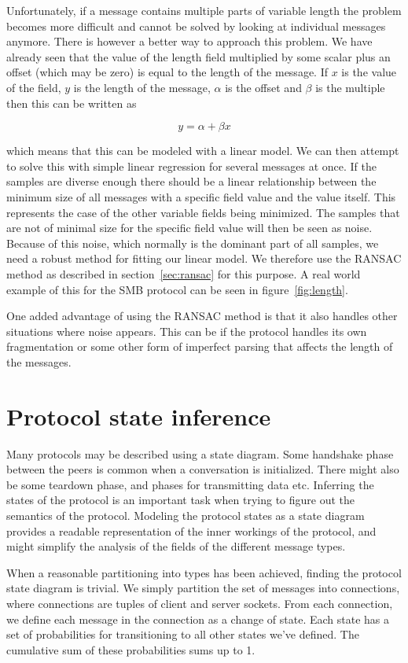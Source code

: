 \documentclass[a4paper]{report}
\begin{document}
Unfortunately, if a message contains multiple parts of variable length the
problem becomes more difficult and cannot be solved by looking at individual
messages anymore. There is however a better way to approach this problem. We
have already seen that the value of the length field multiplied by some scalar
plus an offset (which may be zero) is equal to the length of the message. If
$x$ is the value of the field, $y$ is the length of the message, $\alpha$ is the
offset and $\beta$ is the multiple then this can be written as

\[
    y = \alpha + \beta x
    \label{eq:linlength}
\]

which means that this can be modeled with a linear model. We can then attempt
to solve this with simple linear regression for several messages at once. If
the samples are diverse enough there should be a linear relationship between
the minimum size of all messages with a specific field value and the value
itself. This represents the case of the other variable fields being minimized.
The samples that are not of minimal size for the specific field value will then
be seen as noise. Because of this noise, which normally is the dominant part of
all samples, we need a robust method for fitting our linear model. We therefore
use the RANSAC method as described in section~\ref{sec:ransac} for this
purpose. A real world example of this for the SMB protocol can be seen in
figure~\ref{fig:length}.

One added advantage of using the RANSAC method is that it also handles other
situations where noise appears. This can be if the protocol handles its own
fragmentation or some other form of imperfect parsing that affects the length
of the messages.

\section{Protocol state inference}
Many protocols may be described using a state diagram. Some handshake phase
between the peers is common when a conversation is initialized. There might
also be some teardown phase, and phases for transmitting data etc.
Inferring the states of the protocol is an important task when trying to
figure out the semantics of the protocol. Modeling the protocol states as
a state diagram provides a readable representation of the inner workings
of the protocol, and might simplify the analysis of the fields of the
different message types.

When a reasonable partitioning into types has been achieved, finding the
protocol state diagram is trivial. We simply partition the set of messages
into connections, where connections are tuples of client and server sockets.
From each connection, we define each message in the connection as a change
of state. Each state has a set of probabilities for transitioning to
all other states we've defined. The cumulative sum of these probabilities 
sums up to 1. 
\end{document}
